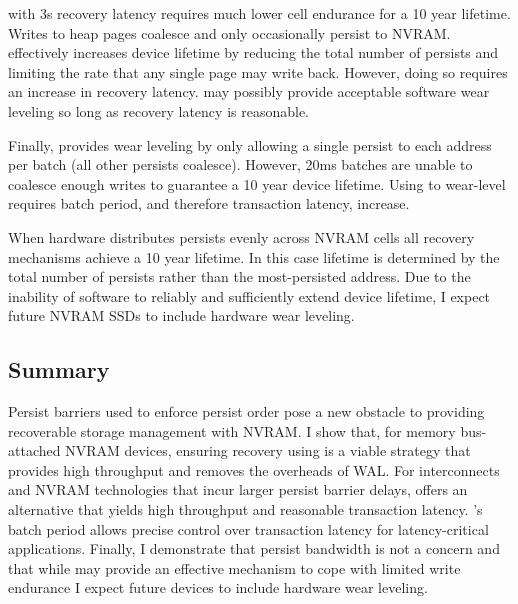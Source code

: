 \NVDisk with 3s recovery latency requires much lower cell endurance for a 10 year lifetime.
Writes to heap pages coalesce and only occasionally persist to NVRAM.
\NVDisk effectively increases device lifetime by reducing the total number of persists and limiting the rate that any single page may write back.
However, doing so requires an increase in recovery latency.
\NVDisk may possibly provide acceptable software wear leveling so long as recovery latency is reasonable.

Finally, \GroupCommit provides wear leveling by only allowing a single persist to each address per batch (all other persists coalesce).
However, 20ms batches are unable to coalesce enough writes to guarantee a 10 year device lifetime.
Using \GroupCommit to wear-level requires batch period, and therefore transaction latency, increase.

When hardware distributes persists evenly across NVRAM cells all recovery mechanisms achieve a 10 year lifetime.
In this case lifetime is determined by the total number of persists rather than the most-persisted address.
Due to the inability of software to reliably and sufficiently extend device lifetime, I expect future NVRAM SSDs to include hardware wear leveling.

\subsection{Summary}
\label{sec:OLTP_eval:Persists:Summary}
Persist barriers used to enforce persist order pose a new obstacle to providing recoverable storage management with NVRAM.
I show that, for memory bus-attached NVRAM devices, ensuring recovery using \InPlace is a viable strategy that provides high throughput and removes the overheads of WAL.
For interconnects and NVRAM technologies that incur larger persist barrier delays, \GroupCommit offers an alternative that yields high throughput and reasonable transaction latency.
\GroupCommit's batch period allows precise control over transaction latency for latency-critical applications.
Finally, I demonstrate that persist bandwidth is not a concern and that while \NVDisk may provide an effective mechanism to cope with limited write endurance I expect future devices to include hardware wear leveling.

